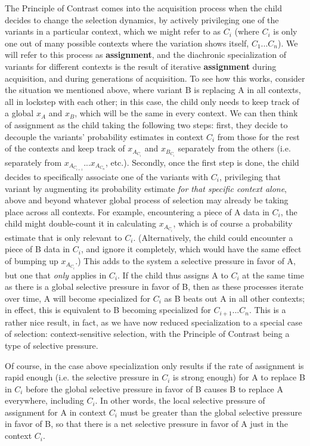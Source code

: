 The Principle of Contrast comes into the acquisition process when the child decides to change the selection dynamics, by actively privileging one of the variants in a particular context, which we might refer to as $C_i$ (where $C_i$ is only one out of many possible contexts where the variation shows itself, $C_1$...$C_n$).
We will refer to this process as \textbf{assignment}, and the diachronic specialization of variants for different contexts is the result of iterative \textbf{assignment} during acquisition, and during generations of acquisition.
To see how this works, consider the situation we mentioned above, where variant B is replacing A in all contexts, all in lockstep with each other; in this case, the child only needs to keep track of a global $x_A$ and $x_B$, which will be the same in every context.
We can then think of assignment as the child taking the following two steps: first, they decide to decouple the variants' probability estimates in context $C_i$ from those for the rest of the contexts and keep track of $x_{A_{C_i}}$ and $x_{B_{C_i}}$ separately from the others (i.e. separately from $x_{A_{C_{i+1}}}$...$x_{A_{C_{n}}}$, etc.).
Secondly, once the first step is done, the child decides to specifically associate one of the variants with $C_i$, privileging that variant by augmenting its probability estimate \textsl{for that specific context alone}, above and beyond whatever global process of selection may already be taking place across all contexts.
For example, encountering a piece of A data in $C_i$, the child might double-count it in calculating $x_{A_{C_i}}$, which is of course a probability estimate that is only relevant to $C_i$.
(Alternatively, the child could encounter a piece of B data in $C_i$, and ignore it completely, which would have the same effect of bumping up $x_{A_{C_i}}$.)
This adds to the system a selective pressure in favor of A, but one that \textsl{only} applies in $C_i$.
If the child thus assigns A to $C_i$ at the same time as there is a global selective pressure in favor of B, then as these processes iterate over time, A will become specialized for $C_i$ as B beats out A in all other contexts; in effect, this is equivalent to B becoming specialized for $C_{i+1}$...$C_n$.
This is a rather nice result, in fact, as we have now reduced specialization to a special case of selection: context-sensitive selection, with the Principle of Contrast being a type of selective pressure.

Of course, in the case above specialization only results if the rate of assignment is rapid enough (i.e. the selective pressure in $C_i$ is strong enough) for A to replace B in $C_i$ before the global selective pressure in favor of B causes B to replace A everywhere, including $C_i$.
In other words, the local selective pressure of assignment for A in context $C_i$ must be greater than the global selective pressure in favor of B, so that there is a net selective pressure in favor of A just in the context $C_i$.

